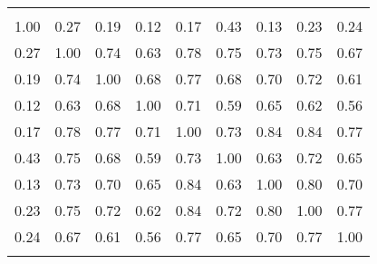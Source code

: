 \begin{tabular}{ccccccccc}
\hline \\

1.00 & 0.27 & 0.19 & 0.12 & 0.17 & 0.43 & 0.13 & 0.23 & 0.24 \\
0.27 & 1.00 & 0.74 & 0.63 & 0.78 & 0.75 & 0.73 & 0.75 & 0.67 \\
0.19 & 0.74 & 1.00 & 0.68 & 0.77 & 0.68 & 0.70 & 0.72 & 0.61 \\
0.12 & 0.63 & 0.68 & 1.00 & 0.71 & 0.59 & 0.65 & 0.62 & 0.56 \\
0.17 & 0.78 & 0.77 & 0.71 & 1.00 & 0.73 & 0.84 & 0.84 & 0.77 \\
0.43 & 0.75 & 0.68 & 0.59 & 0.73 & 1.00 & 0.63 & 0.72 & 0.65 \\
0.13 & 0.73 & 0.70 & 0.65 & 0.84 & 0.63 & 1.00 & 0.80 & 0.70 \\
0.23 & 0.75 & 0.72 & 0.62 & 0.84 & 0.72 & 0.80 & 1.00 & 0.77 \\
0.24 & 0.67 & 0.61 & 0.56 & 0.77 & 0.65 & 0.70 & 0.77 & 1.00 \\

\hline \\
\end{tabular}

